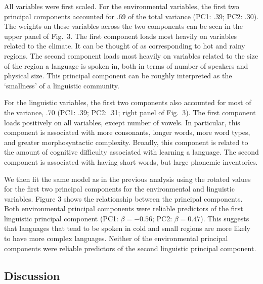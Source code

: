 \documentclass[10pt,letterpaper]{article}
\begin{document}
All variables were first scaled. For the environmental variables, the first two principal components accounted for  .69 of the total variance (PC1: .39; PC2: .30).  The weights on these variables across the two components can be seen in the upper panel of Fig.\ 3. The first component  loads most heavily on variables related to the climate. It can be thought of as corresponding to hot and rainy regions. The second component loads most heavily on variables related to the size of the region a language is spoken in, both in terms of number of speakers and physical size. This principal component can be roughly interpreted as the `smallness' of a linguistic community.

For the linguistic variables, the first two components also accounted for most of the variance, .70 (PC1: .39; PC2: .31; right panel of Fig.\ 3). The first component loads positively on all variables, except number of vowels. In particular, this component is associated with more consonants, longer words, more word types, and greater morphosyntactic complexity. Broadly, this component is related to the amount of cognitive difficulty associated with learning a language. The second component is associated with having short words, but large phonemic inventories. 

We then fit the same model as in the previous analysis using the rotated values for the first two principal components for the environmental and linguistic variables. Figure 3 shows the relationship between the principal components. Both environmental principal components were reliable predictors of the first linguistic principal component (PC1: $\beta=-0.56$; PC2: $\beta=0.47$). This suggests that languages that tend to be  spoken in cold and small regions are more likely to have more complex languages. Neither of the environmental principal components were reliable predictors of the second linguistic principal component.

\subsection{Discussion}


\end{document}

